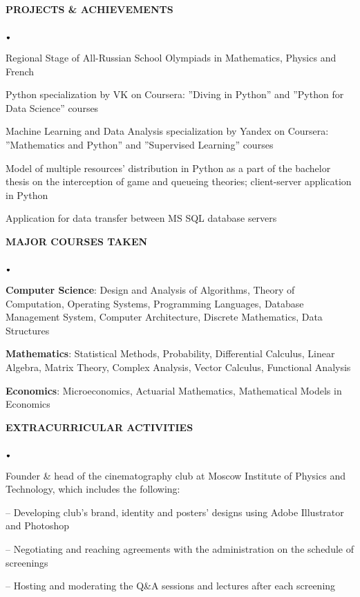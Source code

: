 \documentclass[11pt]{article}
\newcommand{\lineunder}{\vspace*{-8pt} \\ \hspace*{-18pt} \hrulefill \\}
\newcommand{\header}[1]{{\hspace*{-15pt}\vspace*{6pt} \textsc{#1}} \vspace*{-6pt} \lineunder}
\newcommand{\lbt}{\,\begin{picture}(-1,1)(-1,-3)\circle*{3}\end{picture}\ }
\newenvironment{achievements}{
    \begin{list}{$\lbt$}{
        \topsep 0pt
        \itemsep 0pt
        \addtolength{\leftmargin}{-0.1in}
    }
}
{
    \vspace*{4pt}
    \end{list}
}
\begin{document}
\header{\textbf{PROJECTS \& ACHIEVEMENTS}}
\vspace{2mm}
    \begin{achievements}
    \item{Regional Stage of All-Russian School Olympiads in Mathematics, Physics and French}
    \item{Python specialization by VK on Coursera: ''Diving in Python'' and ''Python for Data Science'' courses}
    \item{Machine Learning and Data Analysis specialization by Yandex on Coursera: ''Mathematics and Python'' and ''Supervised Learning'' courses}
    \item{Model of multiple resources' distribution in Python as a part of the bachelor thesis on the interception of game and queueing theories; client-server application in Python}
    \item{Application for data transfer between MS SQL database servers}
    
    
    
    \end{achievements}
\hfill{}


\header{\textbf{MAJOR COURSES TAKEN}}
\vspace{2mm}

   
     \begin{achievements}

    \item{\textbf{Computer Science}: Design and Analysis of Algorithms, Theory of Computation, Operating Systems, Programming Languages, Database Management System, Computer Architecture, Discrete Mathematics, Data Structures}
     \item{\textbf{Mathematics}: Statistical Methods, Probability, Differential Calculus, Linear Algebra, Matrix Theory, Complex Analysis, Vector Calculus, Functional Analysis}
     \item{\textbf{Economics}: Microeconomics, Actuarial Mathematics, Mathematical Models in Economics}
    \end{achievements}
    \hfill{}
   
\header{\textbf{EXTRACURRICULAR ACTIVITIES}}
\vspace{2mm}
\begin{achievements}
\item{Founder \& head of the cinematography club at Moscow Institute of Physics and Technology, which includes the following:}

-- {Developing club's brand, identity and posters' designs using Adobe Illustrator and Photoshop}


-- {Negotiating and reaching agreements with the administration on the schedule of screenings}


-- {Hosting and moderating the Q\&A sessions and lectures after each screening}
\end{achievements}
\end{document}
